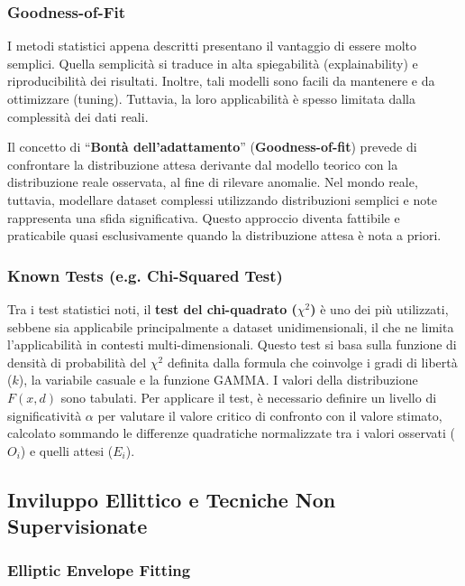 \subsubsection{Goodness-of-Fit}

I metodi statistici appena descritti presentano il vantaggio di
essere molto semplici. Quella semplicità si traduce in alta
spiegabilità (explainability) e riproducibilità dei risultati.
Inoltre, tali modelli sono facili da mantenere e da ottimizzare
(tuning). Tuttavia, la loro applicabilità è spesso limitata dalla
complessità dei dati reali.

Il concetto di ``\textbf{Bontà dell'adattamento}''
(\textbf{Goodness-of-fit}) prevede di confrontare la distribuzione
attesa derivante dal modello teorico con la distribuzione reale
osservata, al fine di rilevare anomalie. Nel mondo reale,
tuttavia, modellare dataset complessi utilizzando distribuzioni
semplici e note rappresenta una sfida significativa. Questo
approccio diventa fattibile e praticabile quasi esclusivamente
quando la distribuzione attesa è nota a priori.

\subsubsection{Known Tests (e.g. Chi-Squared Test)}

Tra i test statistici noti, il \textbf{test del chi-quadrato
($\chi^2$)} è uno dei più utilizzati, sebbene sia applicabile
principalmente a dataset unidimensionali, il che ne limita
l'applicabilità in contesti multi-dimensionali. Questo test si
basa sulla funzione di densità di probabilità del $\chi^2$
definita dalla formula che coinvolge i gradi di libertà ($k$),
la variabile casuale e la funzione GAMMA. I valori della
distribuzione $F(x, d)$ sono tabulati. Per applicare il test, è necessario definire un
livello di significatività $\alpha$ per valutare il valore
critico di confronto con il valore stimato, calcolato sommando
le differenze quadratiche normalizzate tra i valori osservati
($O_i$) e quelli attesi ($E_i$).

\subsection{Inviluppo Ellittico e Tecniche Non Supervisionate}

\subsubsection{Elliptic Envelope Fitting}

